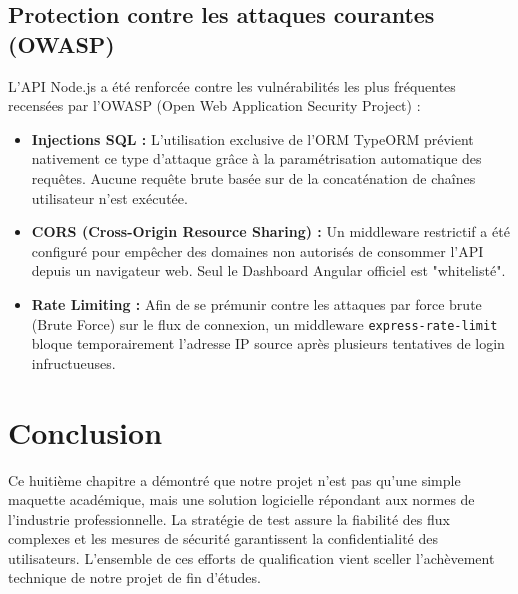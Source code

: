 \subsection{Protection contre les attaques courantes (OWASP)}
L'API Node.js a été renforcée contre les vulnérabilités les plus fréquentes recensées par l'OWASP (Open Web Application Security Project) :
\begin{itemize}
    \item \textbf{Injections SQL :} L'utilisation exclusive de l'ORM TypeORM prévient nativement ce type d'attaque grâce à la paramétrisation automatique des requêtes. Aucune requête brute basée sur de la concaténation de chaînes utilisateur n'est exécutée.
    \item \textbf{CORS (Cross-Origin Resource Sharing) :} Un middleware restrictif a été configuré pour empêcher des domaines non autorisés de consommer l'API depuis un navigateur web. Seul le Dashboard Angular officiel est "whitelisté".
    \item \textbf{Rate Limiting :} Afin de se prémunir contre les attaques par force brute (Brute Force) sur le flux de connexion, un middleware \texttt{express-rate-limit} bloque temporairement l'adresse IP source après plusieurs tentatives de login infructueuses.
\end{itemize}

\section{Conclusion}
Ce huitième chapitre a démontré que notre projet n'est pas qu'une simple maquette académique, mais une solution logicielle répondant aux normes de l'industrie professionnelle. La stratégie de test assure la fiabilité des flux complexes et les mesures de sécurité garantissent la confidentialité des utilisateurs. L'ensemble de ces efforts de qualification vient sceller l'achèvement technique de notre projet de fin d'études.
